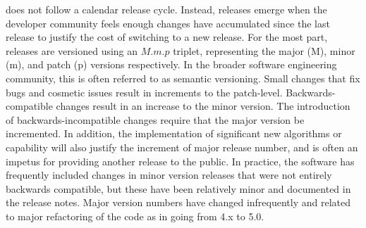 \clawpack does not follow a calendar release cycle.  Instead, releases
emerge when the developer community feels enough changes have
accumulated since the last release to justify
the cost of switching to a new release.  For the most part, \clawpack
releases are
versioned using an $M.m.p$ triplet, representing the major (M), minor (m), and
patch (p) versions respectively.  In the broader software engineering
community, this is often referred to as semantic versioning.  Small
changes that fix bugs and cosmetic issues result in increments to the
patch-level.  Backwards-compatible changes result in an increase to
the minor version.  The introduction of backwards-incompatible changes
require that the major version be incremented.  In addition, the
implementation of significant new algorithms or capability will also
justify the increment of major release number, and is often an impetus
for providing another release to the public.
In practice, the \clawpack software has frequently included changes in minor
version releases that were not entirely backwards compatible, but these have
been relatively minor and documented in the release notes.  Major version
numbers have changed infrequently and related to major refactoring of the
code as in going from 4.x to 5.0.


